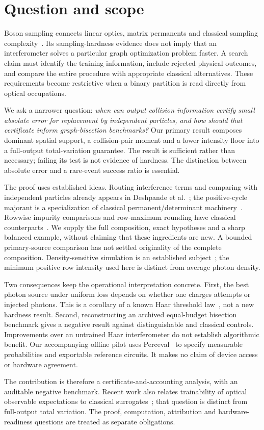 \section{Question and scope}
Boson sampling connects linear optics, matrix permanents and classical sampling complexity~\cite{aaronson2013}. Its sampling-hardness evidence does not imply that an interferometer solves a particular graph optimization problem faster. A search claim must identify the training information, include rejected physical outcomes, and compare the entire procedure with appropriate classical alternatives. These requirements become restrictive when a binary partition is read directly from optical occupations.

We ask a narrower question: \emph{when can output collision information certify small absolute error for replacement by independent particles, and how should that certificate inform graph-bisection benchmarks?} Our primary result composes dominant spatial support, a collision-pair moment and a lower intensity floor into a full-output total-variation guarantee. The result is sufficient rather than necessary; failing its test is not evidence of hardness. The distinction between absolute error and a rare-event success ratio is essential.

The proof uses established ideas. Routing interference terms and comparing with independent particles already appears in Deshpande et al.~\cite{deshpande2018}; the positive-cycle majorant is a specialization of classical permanent/determinant machinery~\cite{etingof2006}. Rowwise impurity comparisons and row-maximum rounding have classical counterparts~\cite{rioul2023,jiang2019}. We supply the full composition, exact hypotheses and a sharp balanced example, without claiming that these ingredients are new. A bounded primary-source comparison has not settled originality of the complete composition. Density-sensitive simulation is an established subject~\cite{shchesnovich2021}; the minimum positive row intensity used here is distinct from average photon density.

Two consequences keep the operational interpretation concrete. First, the best photon source under uniform loss depends on whether one charges attempts or injected photons. This is a corollary of a known Haar threshold law~\cite{bouland2023}, not a new hardness result. Second, reconstructing an archived equal-budget bisection benchmark gives a negative result against distinguishable and classical controls. Improvements over an untrained Haar interferometer do not establish algorithmic benefit. Our accompanying offline pilot uses Perceval~\cite{heurtel2023} to specify measurable probabilities and exportable reference circuits. It makes no claim of device access or hardware agreement.

The contribution is therefore a certificate-and-accounting analysis, with an auditable negative benchmark. Recent work also relates trainability of optical observable expectations to classical surrogates~\cite{monbroussou2026}; that question is distinct from full-output total variation. The proof, computation, attribution and hardware-readiness questions are treated as separate obligations.

